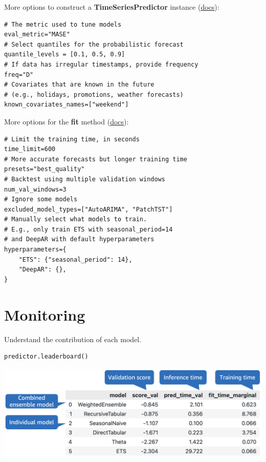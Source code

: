 More options to construct a \textbf{TimeSeriesPredictor} instance (\href{https://auto.gluon.ai/stable/api/autogluon.timeseries.TimeSeriesPredictor.html}{docs}):

\begin{verbatim}
# The metric used to tune models
eval_metric="MASE"
# Select quantiles for the probabilistic forecast
quantile_levels = [0.1, 0.5, 0.9]
# If data has irregular timestamps, provide frequency
freq="D"
# Covariates that are known in the future
# (e.g., holidays, promotions, weather forecasts)
known_covariates_names=["weekend"]
\end{verbatim}
More options for the \textbf{fit} method (\href{https://auto.gluon.ai/stable/api/autogluon.timeseries.TimeSeriesPredictor.fit.html}{docs}):

\begin{verbatim}
# Limit the training time, in seconds
time_limit=600
# More accurate forecasts but longer training time
presets="best_quality"
# Backtest using multiple validation windows
num_val_windows=3
# Ignore some models
excluded_model_types=["AutoARIMA", "PatchTST"]
# Manually select what models to train.
# E.g., only train ETS with seasonal_period=14
# and DeepAR with default hyperparameters
hyperparameters={
    "ETS": {"seasonal_period": 14},
    "DeepAR": {},
}
\end{verbatim}



\section*{Monitoring}
Understand the contribution of each model.

\begin{verbatim}
predictor.leaderboard()
\end{verbatim}

\includegraphics[width=\linewidth]{timeseries/images/leaderboard.png}

